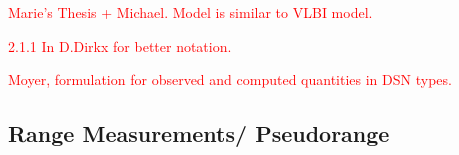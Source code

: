 \textcolor{red}{Marie's Thesis + Michael. Model is similar to VLBI model.}

\textcolor{red}{2.1.1 In D.Dirkx for better notation.}

\textcolor{red}{Moyer, formulation for observed and computed quantities in DSN types.}
\subsection{Range Measurements/ Pseudorange}


%
%
%
%
%
%
%
%
